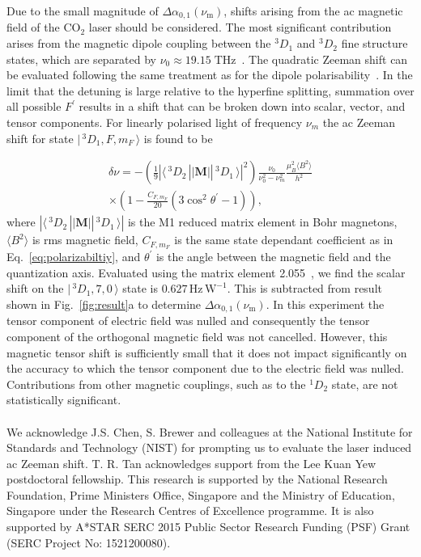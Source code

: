 \documentclass[pra,aps,showpacs,floatfix,twocolumn,nofootinbib,citeautoscript]{revtex4-1}
\def\ket#1{|\,#1 \,\rangle}
\def\bra#1{\langle \, #1 \,|}
\newcommand{\fref}[1]{Fig.~\ref{#1}}
\begin{document}
Due to the small magnitude of $\Delta \alpha_{0,1}(\nu_\mathrm{m})$, shifts arising from the ac magnetic field of the CO$_2$ laser should be considered. The most significant contribution arises from the magnetic dipole coupling between the $^3D_1$ and $^3D_2$ fine structure states, which are separated by $\nu_0 \approx 19.15\;\mathrm{THz}$~\cite{dean2017}.  The quadratic Zeeman shift can be evaluated following the same treatment as for the dipole polarisability~\cite{polarizability2013}. In the limit that the detuning is large relative to the hyperfine splitting, summation over all possible $F^\prime$ results in a shift that can be broken down into scalar, vector, and tensor components. For linearly polarised light of frequency $\nu_m$ the ac Zeeman shift for state $\ket{^3D_1,F,m_F}$ is found to be

\begin{multline}
\label{finestructure}
\delta \nu = -\left(\frac{1}{9}|\bra{{^3D_2}}|\mathbf{M}|\ket{{^3D_1}}|^2\right)\frac{\nu_{0}}{\nu_{0}^2-\nu_m^2}\frac{\mu_B^2 \langle B^2\rangle}{h^2} \\
\times\left(1-\frac{C_{F,m_F}}{20}\left(3\cos^2\theta^\prime-1\right)\right),
\end{multline}
where $|\bra{{^3D_2}}|\mathbf{M}|\ket{{^3D_1}}|$ is the M1 reduced matrix element in Bohr magnetons, $\langle B^2\rangle$ is rms magnetic field, $C_{F,m_F}$ is the same state dependant coefficient as in Eq.~\ref{eq:polarizabiltiy}, and $\theta^\prime$ is the angle between the magnetic field and the quantization axis. Evaluated using the matrix element 2.055~\cite{luprop2016}, we find the scalar shift on the $\ket{^3D_1,7,0}$ state is $0.627 \,\mathrm{Hz}\,\mathrm{W}^{-1}$. This is subtracted from result shown in \fref{fig:result}a to determine $\Delta \alpha_{0,1}(\nu_\mathrm{m})$.  In this experiment the tensor component of electric field was nulled and consequently the tensor component of the orthogonal magnetic field was not cancelled. However, this magnetic tensor shift is sufficiently small that it does not impact significantly on the accuracy to which the tensor component due to the electric field was nulled. Contributions from other magnetic couplings, such as to the $^1D_2$ state, are not statistically significant. \\

\\
We acknowledge J.S. Chen, S. Brewer and colleagues at the National Institute for Standards and Technology (NIST) for prompting us to evaluate the laser induced ac Zeeman shift.  T. R. Tan acknowledges support from the Lee Kuan Yew postdoctoral fellowship. This research is supported by the National Research Foundation, Prime Ministers Office, Singapore and the Ministry of Education, Singapore under the Research Centres of Excellence programme. It is also supported by A*STAR SERC 2015 Public Sector Research Funding (PSF) Grant (SERC Project No: 1521200080).\\
\end{document}
